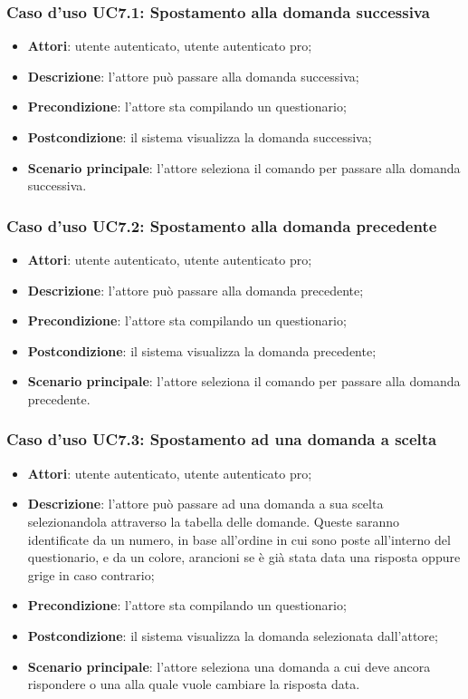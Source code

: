 \subsubsection{Caso d'uso UC7.1: Spostamento alla domanda successiva}
\label{UC7.1}
\begin{itemize}
\item\textbf{Attori}: utente autenticato, utente autenticato pro;
\item\textbf{Descrizione}: l'attore può passare alla domanda successiva;
\item\textbf{Precondizione}: l'attore sta compilando un questionario;
\item\textbf{Postcondizione}: il sistema visualizza la domanda successiva;
\item\textbf{Scenario principale}: l'attore seleziona il comando per passare alla domanda successiva.
\end{itemize}

\subsubsection{Caso d'uso UC7.2: Spostamento alla domanda precedente}
\label{UC7.2}
\begin{itemize}
\item\textbf{Attori}: utente autenticato, utente autenticato pro;
\item\textbf{Descrizione}: l'attore può passare alla domanda precedente;
\item\textbf{Precondizione}: l'attore sta compilando un questionario;
\item\textbf{Postcondizione}: il sistema visualizza la domanda precedente;
\item\textbf{Scenario principale}: l'attore seleziona il comando per passare alla domanda precedente.
\end{itemize}

\subsubsection{Caso d'uso UC7.3: Spostamento ad una domanda a scelta}
\label{UC7.3}
\begin{itemize}
\item\textbf{Attori}: utente autenticato, utente autenticato pro;
\item\textbf{Descrizione}: l'attore può passare ad una domanda a sua scelta selezionandola attraverso la tabella delle domande. Queste saranno identificate da un numero, in base all'ordine in cui sono poste all'interno del questionario, e da un colore, arancioni se è già stata data una risposta oppure grige in caso contrario;
\item\textbf{Precondizione}: l'attore sta compilando un questionario;
\item\textbf{Postcondizione}: il sistema visualizza la domanda selezionata dall'attore;
\item\textbf{Scenario principale}: l'attore seleziona una domanda a cui deve ancora rispondere o una alla quale vuole cambiare la risposta data.
\end{itemize}

